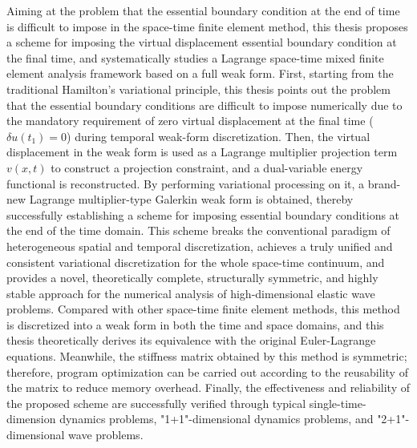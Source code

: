 \begin{abstractEn}
    Aiming at the problem that the essential boundary condition at the end of time is difficult to impose in the space-time finite element method, this thesis proposes a scheme for imposing the virtual displacement essential boundary condition at the final time, and systematically studies a Lagrange space-time mixed finite element analysis framework based on a full weak form. First, starting from the traditional Hamilton's variational principle, this thesis points out the problem that the essential boundary conditions are difficult to impose numerically due to the mandatory requirement of zero virtual displacement at the final time ($\delta u(t_1)=0$) during temporal weak-form discretization. Then, the virtual displacement in the weak form is used as a Lagrange multiplier projection term $v(x,t)$ to construct a projection constraint, and a dual-variable energy functional is reconstructed. By performing variational processing on it, a brand-new Lagrange multiplier-type Galerkin weak form is obtained, thereby successfully establishing a scheme for imposing essential boundary conditions at the end of the time domain. This scheme breaks the conventional paradigm of heterogeneous spatial and temporal discretization, achieves a truly unified and consistent variational discretization for the whole space-time continuum, and provides a novel, theoretically complete, structurally symmetric, and highly stable approach for the numerical analysis of high-dimensional elastic wave problems. Compared with other space-time finite element methods, this method is discretized into a weak form in both the time and space domains, and this thesis theoretically derives its equivalence with the original Euler-Lagrange equations. Meanwhile, the stiffness matrix obtained by this method is symmetric; therefore, program optimization can be carried out according to the reusability of the matrix to reduce memory overhead. Finally, the effectiveness and reliability of the proposed scheme are successfully verified through typical single-time-dimension dynamics problems, "1+1"-dimensional dynamics problems, and "2+1"-dimensional wave problems.
\end{abstractEn}
